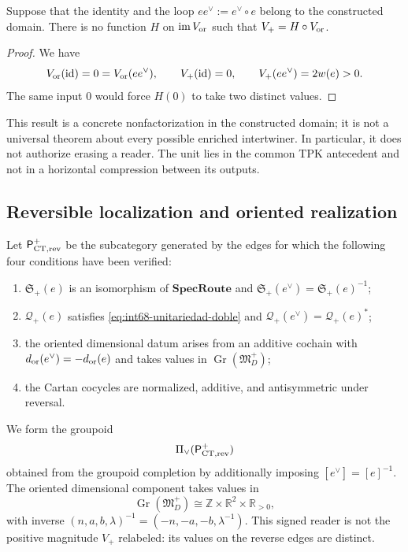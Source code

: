 \begin{proposition}
\label{prop:int68-no-factorizacion}
Suppose that the identity and the loop
\(ee^\vee:=e^\vee\circ e\) belong to the constructed domain. There is no
function \(H\) on \(\operatorname{im}V_{\rm or}\) such that
\(V_+=H\circ V_{\rm or}\).
\end{proposition}

\begin{proof}
We have
\[
 V_{\rm or}(\operatorname{id})=0
 =V_{\rm or}(ee^\vee),
 \qquad
 V_+(\operatorname{id})=0,
 \qquad
 V_+(ee^\vee)=2w(e)>0.
\]
The same input \(0\) would force \(H(0)\) to take two distinct values.
\end{proof}

This result is a concrete nonfactorization in the constructed domain; it
is not a universal theorem about every possible enriched intertwiner.
In particular, it does not authorize erasing a reader. The unit lies in the
common TPK antecedent and not in a horizontal compression between its outputs.

\subsection{Reversible localization and oriented realization}

Let \(\mathsf P_{{\rm CT},{\rm rev}}^+\) be the subcategory generated by the
edges for which the following four conditions have been verified:
\begin{enumerate}
 \item \(\mathfrak S_+(e)\) is an isomorphism of
       \(\mathbf{SpecRoute}\) and
       \(\mathfrak S_+(e^\vee)=\mathfrak S_+(e)^{-1}\);
 \item \(\mathcal Q_+(e)\) satisfies
       \eqref{eq:int68-unitariedad-doble} and
       \(\mathcal Q_+(e^\vee)=\mathcal Q_+(e)^*\);
 \item the oriented dimensional datum arises from an additive cochain with
       \(d_{\rm or}(e^\vee)=-d_{\rm or}(e)\) and takes values in
       \(\operatorname{Gr}(\mathfrak M_D^+)\);
 \item the Cartan cocycles are normalized, additive, and antisymmetric
       under reversal.
\end{enumerate}
We form the groupoid
\[
 \Pi_\vee(\mathsf P_{{\rm CT},{\rm rev}}^+)
\]
obtained from the groupoid completion by additionally imposing
\([e^\vee]=[e]^{-1}\). The oriented dimensional component takes values in
\begin{equation}
 \operatorname{Gr}(\mathfrak M_D^+)
 \cong\mathbb Z\times\mathbb R^2\times\mathbb R_{>0},
 \label{eq:int68-grothendieck-dimensional}
\end{equation}
with inverse
\((n,a,b,\lambda)^{-1}=(-n,-a,-b,\lambda^{-1})\). This signed reader is not
the positive magnitude \(V_+\) relabeled: its values on the reverse
edges are distinct.

